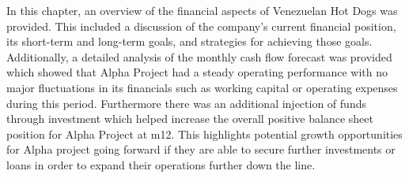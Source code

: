  

In this chapter, an overview of the financial aspects of Venezuelan Hot Dogs was provided. This included a discussion of the company's current financial position, its short-term and long-term goals, and strategies for achieving those goals. Additionally, a detailed analysis of the monthly cash flow forecast was provided which showed that Alpha Project had a steady operating performance with no major fluctuations in its financials such as working capital or operating expenses during this period. Furthermore there was an additional injection of funds through investment which helped increase the overall positive balance sheet position for Alpha Project at m12. This highlights potential growth opportunities for Alpha project going forward if they are able to secure further investments or loans in order to expand their operations further down the line.